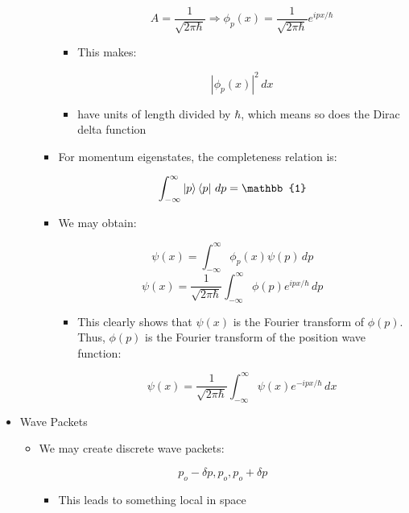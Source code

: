 \begin{itemize}
\begin{itemize}
\begin{itemize}
\begin{itemize}
                $$A=\frac{1}{\sqrt{2\pi \hbar}}\Rightarrow \phi_p(x)=\frac{1}{\sqrt{2\pi \hbar}}e^{ipx/\hbar}$$

              \item This makes:

                $$|\phi_p(x)|^2\,dx$$

              \item have units of length divided by $\hbar$, which means so does the Dirac delta function

            \end{itemize}

          \item For momentum eigenstates, the completeness relation is:

            $$\int_{-\infty}^{\infty}\ket{p}\bra{p}\,dp=\mathbb{1}$$

          \item We may obtain:

            $$\psi(x)=\int_{-\infty}^{\infty}\phi_p(x)\psi(p)\,dp$$
            $$\psi(x)=\frac{1}{\sqrt{2\pi\hbar}}\int_{-\infty}^{\infty}\phi(p)e^{ipx/\hbar}\,dp$$

            \begin{itemize}

              \item This clearly shows that $\psi(x)$ is the Fourier transform of $\phi(p)$. Thus, $\phi(p)$ is the Fourier transform of the position wave function:

                $$\psi(x)=\frac{1}{\sqrt{2\pi\hbar}}\int_{-\infty}^{\infty}\psi(x)e^{-ipx/\hbar}\,dx$$

            \end{itemize}

        \end{itemize}

    \end{itemize}

  \item Wave Packets

    \begin{itemize}

      \item We may create discrete wave packets:

        $$p_o-\delta p, p_o, p_o+\delta p$$

        \begin{itemize}

          \item This leads to something local in space


\end{itemize}
\end{itemize}
\end{itemize}
